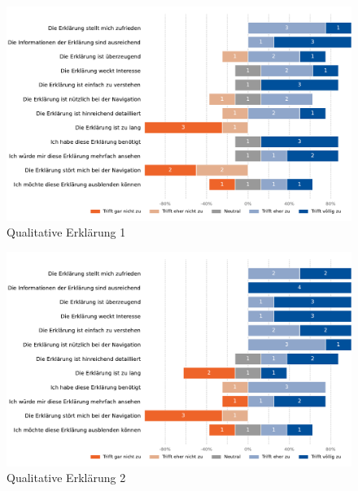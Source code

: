 \begin{figure}[htb!]
    \centering
    \includegraphics[width=\textwidth]{contents/06_model_evaluation/02_evaluation/res/qualitativeFeedback-01_collaborative_routing.pdf}
    \caption{Qualitative Erklärung 1}
    \label{fig:qualitative_evaluation_explanation1}
\end{figure}

\begin{figure}[htb!]
    \centering
    \includegraphics[width=\textwidth]{contents/06_model_evaluation/02_evaluation/res/qualitativeFeedback-02_collaborative_algorithm.pdf}
    \caption{Qualitative Erklärung 2}
    \label{fig:qualitative_evaluation_explanation2}
\end{figure}

